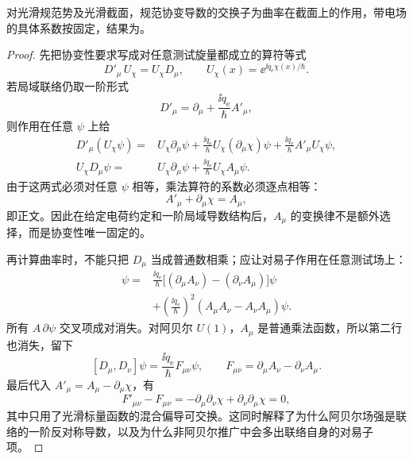 \begin{lemma}[协变导数的交换子]
对光滑规范势及光滑截面，规范协变导数的交换子为曲率在截面上的作用，带电场的具体系数按固定，结果为。
\end{lemma}
\begin{proof}
先把协变性要求写成对任意测试旋量都成立的算符等式
\[
D'_\mu\,U_\chi=U_\chi D_\mu,
\qquad
U_\chi(x)=\ee^{\ii q_{\mathrm e}\chi(x)/\hbar}.
\]
若局域联络仍取一阶形式
\[
D'_\mu=\partial_\mu+\frac{\ii q_{\mathrm e}}{\hbar}A'_\mu,
\]
则作用在任意 $\psi$ 上给
\begin{align*}
D'_\mu(U_\chi\psi)
={}&U_\chi\partial_\mu\psi
+\frac{\ii q_{\mathrm e}}{\hbar}U_\chi(\partial_\mu\chi)\psi
+\frac{\ii q_{\mathrm e}}{\hbar}A'_\mu U_\chi\psi,\\
U_\chi D_\mu\psi
={}&U_\chi\partial_\mu\psi
+\frac{\ii q_{\mathrm e}}{\hbar}U_\chi A_\mu\psi.
\end{align*}
由于这两式必须对任意 $\psi$ 相等，乘法算符的系数必须逐点相等：
\[
A'_\mu+\partial_\mu\chi=A_\mu,
\]
即正文。因此在给定电荷约定和一阶局域导数结构后，$A_\mu$ 的变换律不是额外选择，而是协变性唯一固定的。

再计算曲率时，不能只把 $D_\mu$ 当成普通数相乘；应让对易子作用在任意测试场上：
\begin{align*}
[D_\mu,D_\nu]\psi
={}&\frac{\ii q_{\mathrm e}}{\hbar}
\bigl[(\partial_\mu A_\nu)-(\partial_\nu A_\mu)\bigr]\psi\\
&+\left(\frac{\ii q_{\mathrm e}}{\hbar}\right)^2
(A_\mu A_\nu-A_\nu A_\mu)\psi.
\end{align*}
所有 $A\,\partial\psi$ 交叉项成对消失。对阿贝尔 $U(1)$，$A_\mu$ 是普通乘法函数，所以第二行也消失，留下
\[
[D_\mu,D_\nu]\psi
=\frac{\ii q_{\mathrm e}}{\hbar}F_{\mu\nu}\psi,
\qquad
F_{\mu\nu}=\partial_\mu A_\nu-\partial_\nu A_\mu.
\]
最后代入 $A'_\mu=A_\mu-\partial_\mu\chi$，有
\[
F'_{\mu\nu}-F_{\mu\nu}
=-\partial_\mu\partial_\nu\chi
+\partial_\nu\partial_\mu\chi=0,
\]
其中只用了光滑标量函数的混合偏导可交换。这同时解释了为什么阿贝尔场强是联络的一阶反对称导数，以及为什么非阿贝尔推广中会多出联络自身的对易子项。
\end{proof}

